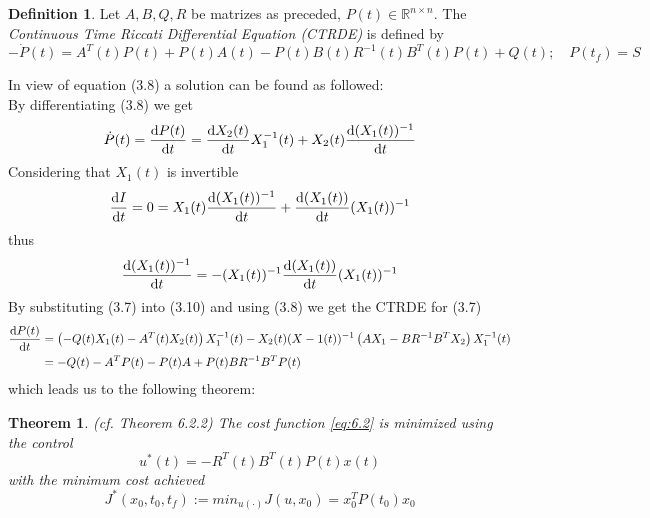 \documentclass[paper=a4, pagesize, DIV=calc, BCOR=12.5mm, twoside=on, onecolumn=on, open = any, titlepage =on, parskip =half-, headsepline = on, footsepline = on, chapterprefix = on, appendixprefix = off, fontsize = 12pt, numbers = noenddot, abstract = on]{scrbook}
\numberwithin{equation}{chapter}
\theoremstyle{definition}
\newtheorem{definition}{Definition}
\theoremstyle{plain}
\theoremstyle{plain}
\newtheorem{satz}{Theorem}
\theoremstyle{remark}
\theoremstyle{plain}
\theoremstyle{plain}
\begin{document}
\begin{definition}
Let $A, B, Q, R$ be matrizes as preceded, $P(t) \in \mathbb{R}^{n \times n}$. The \emph{Continuous Time Riccati Differential Equation (CTRDE)} is defined by
\begin{equation}
-\dot{P} (t) = A^T(t)P(t) + P(t)A(t) - P(t)B(t)R^{-1}(t)B^T(t)P(t) + Q(t); \quad P(t_f) = S \label{eq:CTRDE}
\end{equation}
\end{definition}
In view of equation (3.8) a solution can be found as followed:\\
By differentiating (3.8) we get
\begin{equation}
\dot{P}(t) = \frac{\mathop{}\!\mathrm{d} P(t)}{\mathop{}\!\mathrm{d} t} = \frac{\mathop{}\!\mathrm{d} X_2(t)}{\mathop{}\!\mathrm{d} t}X_1^{-1}(t) + X_2(t)\frac{\mathop{}\!\mathrm{d} (X_1(t))^{-1}}{\mathop{}\!\mathrm{d} t}
\end{equation}
Considering that $X_1(t)$ is invertible
\begin{equation}
\frac{\mathop{}\!\mathrm{d} I}{\mathop{}\!\mathrm{d} t} = 0 = X_1(t) \frac{\mathop{}\!\mathrm{d} (X_1(t))^{-1}}{\mathop{}\!\mathrm{d} t} + \frac{\mathop{}\!\mathrm{d} (X_1(t))}{\mathop{}\!\mathrm{d} t}(X_1(t))^{-1}
\end{equation}
thus
\begin{equation}
\frac{\mathop{}\!\mathrm{d}(X_1(t))^{-1}}{\mathop{}\!\mathrm{d} t} = -(X_1(t))^{-1} \frac{\mathop{}\!\mathrm{d}(X_1(t))}{\mathop{}\!\mathrm{d} t}(X_1(t))^{-1}
\end{equation}
By substituting (3.7) into (3.10) and using (3.8) we get the CTRDE for (3.7)
\begin{align*}
\frac{\mathop{}\!\mathrm{d} P(t)}{\mathop{}\!\mathrm{d} t} &= \left( -Q(t)X_1(t)-A^T(t)X_2(t) \right) X_1^{-1}(t) - X_2(t)(X-1(t))^{-1}\left(A X_1 -BR^{-1}B^TX_2 \right) X_1^{-1}(t)\\
 &= -Q(t) - A^TP(t) - P(t)A + P(t)BR^{-1}B^TP(t)
\end{align*}
which leads us to the following theorem:
\begin{satz}
(cf. \cite{li:2006} Theorem 6.2.2) \newline
The cost function \eqref{eq:6.2} is minimized using the control 
\begin{equation}
u^*(t) = -R^T(t)B^T(t)P(t)x(t)
\end{equation}
with the minimum cost achieved
\begin{equation}
J^*(x_0,t_0,t_f) := min_{u(\cdot)}J(u, x_0) = x_0^TP(t_0)x_0
\end{equation}
\end{satz}
\end{document}
